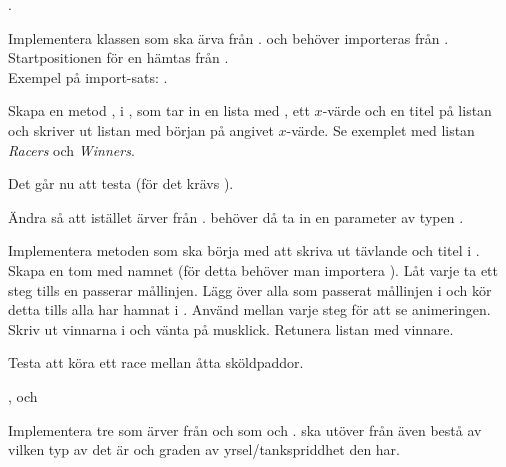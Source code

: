 \Task {}.

\Subtask Implementera klassen  som ska ärva från .  och  behöver importeras från . Startpositionen för en  hämtas från .\\Exempel på import-sats: .

\Subtask Skapa en metod , i , som tar in en lista med , ett $x$-värde och en titel på listan och skriver ut listan med början på angivet $x$-värde. Se exemplet med listan \textit{Racers} och \textit{Winners}.

\Subtask Det går nu att testa  (för det krävs ).

\Subtask Ändra så att  istället ärver från .  behöver då ta in en parameter av typen .

\Task {}

\Subtask Implementera metoden  som ska börja med att skriva ut tävlande och titel i . Skapa en tom  med namnet  (för detta behöver man importera ). Låt varje  ta ett steg tills en passerar mållinjen. Lägg över alla som passerat mållinjen i  och kör detta tills alla  har hamnat i . Använd  mellan varje steg för att se animeringen. Skriv ut vinnarna i  och vänta på musklick. Retunera listan med vinnare.

\Subtask Testa att köra ett race mellan åtta sköldpaddor.

\Task {},  och 

\Subtask Implementera tre  som ärver från  och som   och .  ska utöver  från  även bestå av vilken typ av  det är och graden av yrsel/tankspriddhet den har.

